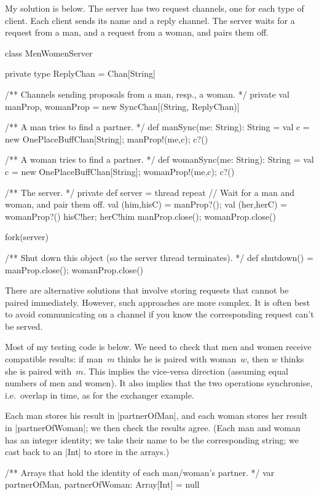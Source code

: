 \begin{answerI}
My solution is below.  The server has two request channels, one for each type
of client.  Each client sends its name and a reply channel.  The server waits
for a request from a man, and a request from a woman, and pairs them off.
%
\begin{scala}
class MenWomenServer{
  private type ReplyChan = Chan[String]

  /** Channels sending proposals from a man, resp., a woman. */
  private val manProp, womanProp = new SyncChan[(String, ReplyChan)]

  /** A man tries to find a partner. */
  def manSync(me: String): String = {
    val c = new OnePlaceBuffChan[String]; manProp!(me,c); c?()
  }

  /** A woman tries to find a partner. */
  def womanSync(me: String): String = {
    val c = new OnePlaceBuffChan[String]; womanProp!(me,c); c?()
  }

  /** The server. */
  private def server = thread{
    repeat{
      // Wait for a man and woman, and pair them off. 
      val (him,hisC) = manProp?(); val (her,herC) = womanProp?()
      hisC!her; herC!him
    }
    manProp.close(); womanProp.close()
  }

  fork(server)

  /** Shut down this object (so the server thread terminates). */
  def shutdown() = { manProp.close(); womanProp.close() }
}
\end{scala}


There are alternative solutions that involve storing requests that cannot be
paired immediately.  However, such approaches are more complex.  It is often
best to avoid communicating on a channel if you know the corresponding request
can't be served.


Most of my testing code is below.  We need to check that men and women receive
compatible results: if man~$m$ thinks he is paired with woman~$w$, then $w$
thinks she is paired with~$m$.  This implies the vice-versa direction
(assuming equal numbers of men and women).  It also implies that the two
operations synchronise, i.e.~overlap in time, as for the exchanger example.

Each man stores his result in |partnerOfMan|, and each woman stores her result
in |partnerOfWoman|; we then check the results agree.  (Each man and woman has
an integer identity; we take their name to be the corresponding string; we
cast back to an |Int| to store in the arrays.)
%
\begin{scala}
  /** Arrays that hold the identity of each man/woman's partner. */
  var partnerOfMan, partnerOfWoman: Array[Int] = null


\end{scala}
\end{answerI}
